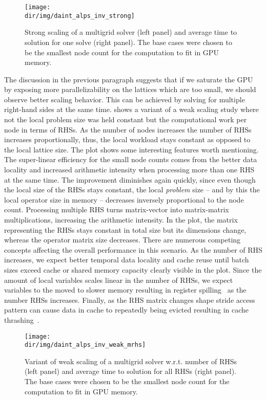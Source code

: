 \begin{figure}
\centering
\texttt{[image: \\dir/img/daint\_alps\_inv\_strong]}
\caption{
Strong scaling of a multigrid solver (left panel) and average time to solution for one solve (right panel).
The base cases were chosen to be the smallest node count for the computation to fit in GPU memory.
}
\label{fig:daint:alps:inv:strong}
\end{figure}

The discussion in the previous paragraph suggests that if we saturate the GPU by exposing more parallelizability on the lattices which are too small, we should observe better scaling behavior.
This can be achieved by solving for multiple right-hand sides at the same time.
 shows a variant of a weak scaling study where not the local problem size was held constant but the computational work per node in terms of RHSs.
As the number of nodes increases the number of RHSs increases proportionally, thus, the local workload stays constant as opposed to the local lattice size.
The plot shows some interesting features worth mentioning.
The super-linear efficiency for the small node counts comes from the better data locality and increased arithmetic intensity when processing more than one RHS at the same time.
The improvement diminishes again quickly, since even though the local size of the RHSs stays constant, the local \emph{problem} size -- and by this the local operator size in memory -- decreases inversely proportional to the node count.
Processing multiple RHS turns matrix-vector into matrix-matrix multiplications, increasing the arithmetic intensity.
In the plot, the matrix representing the RHSs stays constant in total size but its dimensions change, whereas the operator matrix size decreases.
There are numerous competing concepts affecting the overall performance in this scenario.
As the number of RHS increases, we expect better temporal data locality and cache reuse until batch sizes exceed cache or shared memory capacity clearly visible in the plot.
Since the amount of local variables scales linear in the number of RHSs, we expect variables to the moved to slower memory resulting in register spilling~\cite{CHAITIN198147} as the number RHSs increases.
Finally, as the RHS matrix changes shape stride access pattern can cause data in cache to repeatedly being evicted resulting in cache thrashing~\cite{10.1145/1476589.1476705}.
\begin{figure}
\centering
\texttt{[image: \\dir/img/daint\_alps\_inv\_weak\_mrhs]}
\caption{
Variant of weak scaling of a multigrid solver w.r.t. number of RHSs (left panel) and average time to solution for all RHSs (right panel).
The base cases were chosen to be the smallest node count for the computation to fit in GPU memory.
}
\label{fig:daint:alps:inv:weak:mrhs}
\end{figure}

